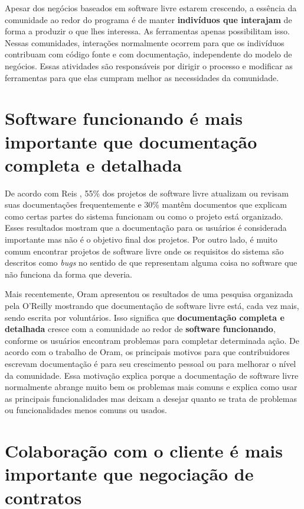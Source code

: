 Apesar dos negócios baseados em software livre estarem crescendo, a
essência da comunidade ao redor do programa é de manter
\textbf{indivíduos que interajam} de forma a produzir o que lhes
interessa. As ferramentas apenas possibilitam isso. Nessas
comunidades, interações normalmente ocorrem para que os indivíduos
contribuam com código fonte e com documentação, independente do modelo
de negócios. Essas atividades são responsáveis por dirigir o processo
e modificar as ferramentas para que elas cumpram melhor as
necessidades da comunidade.

\section{Software funcionando é mais importante que documentação
  completa e detalhada}
\label{sec:second-princ}

De acordo com Reis \cite{Reis2003}, 55\% dos projetos de software
livre atualizam ou revisam suas documentações frequentemente e 30\%
mantêm documentos que explicam como certas partes do sistema funcionam
ou como o projeto está organizado. Esses resultados mostram que a
documentação para os usuários é considerada importante mas não é o
objetivo final dos projetos. Por outro lado, é muito comum encontrar
projetos de software livre onde os requisitos do sistema são descritos
como \emph{bugs} no sentido de que representam alguma coisa no
software que não funciona da forma que deveria.

Mais recentemente, Oram \cite{Oram2007} apresentou os resultados de
uma pesquisa organizada pela O'Reilly mostrando que documentação de
software livre está, cada vez mais, sendo escrita por
voluntários. Isso significa que \textbf{documentação completa e
  detalhada} cresce com a comunidade ao redor de \textbf{software
  funcionando}, conforme os usuários encontram problemas para
completar determinada ação. De acordo com o trabalho de Oram, os
principais motivos para que contribuidores escrevam documentação é
para seu crescimento pessoal ou para melhorar o nível da
comunidade. Essa motivação explica porque a documentação de software
livre normalmente abrange muito bem os problemas mais comuns e explica
como usar as principais funcionalidades mas deixam a desejar quanto se
trata de problemas ou funcionalidades menos comuns ou usados.

\section{Colaboração com o cliente é mais importante que negociação de
  contratos}
\label{sec:third-princ}


